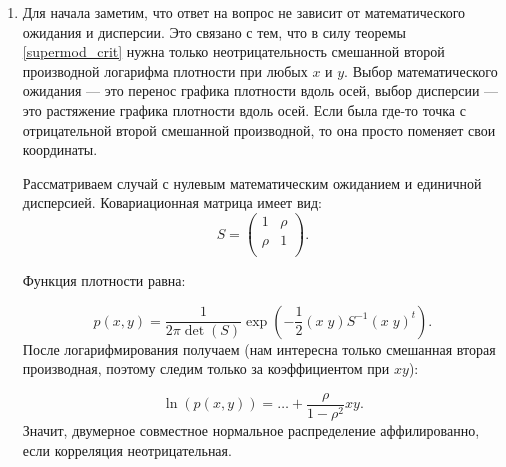 \begin{enumerate}
\begin{enumerate}
\end{enumerate}

\item Для начала заметим, что ответ на вопрос не зависит от математического ожидания и дисперсии. Это связано с тем, что в силу теоремы \ref{supermod_crit} нужна только неотрицательность смешанной второй производной логарифма плотности при любых $ x $ и $ y $. Выбор математического ожидания — это перенос графика плотности вдоль осей, выбор дисперсии — это растяжение графика плотности вдоль осей. Если была где-то точка с отрицательной второй смешанной производной, то она просто поменяет свои координаты.

Рассматриваем случай с нулевым математическим ожиданием и единичной дисперсией. Ковариационная матрица имеет вид:
\begin{equation}
S=\begin{pmatrix}
1 & \rho \\
\rho & 1 \\
\end{pmatrix}.
\end{equation}

Функция плотности равна:

\begin{equation}
p(x,y)=\frac{1}{2\pi \det(S)} \exp\left(-\frac{1}{2}(x\; y)S^{-1}(x\; y)^{t}\right).
\end{equation}
После логарифмирования получаем (нам интересна только смешанная вторая производная, поэтому следим только за коэффициентом при $ xy $):

\begin{equation}
\ln (p(x,y))=\ldots+\frac{\rho}{1-\rho^{2}}xy.
\end{equation}
Значит, двумерное совместное нормальное распределение аффилированно, если корреляция неотрицательная.


\end{enumerate}

